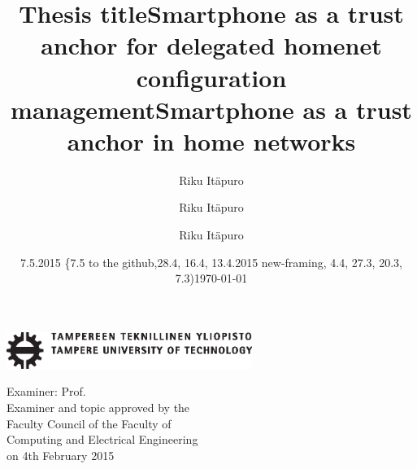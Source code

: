 \documentclass[12pt,a4paper,english]{tutthesis}
\author{Riku Itäpuro}
\title{Thesis title}      %
\author{Riku Itäpuro}
\title{Smartphone as a trust anchor for delegated homenet configuration management}
\author{Riku Itäpuro}
\date{7.5.2015 \{7.5 to the github,28.4, 16.4, 13.4.2015 new-framing, 4.4, 27.3,  20.3, 7.3)}
\title{Smartphone as a trust anchor in home networks}
\begin{document}
\maketitle



\newpage             %

 \pagestyle{headings}
 \thispagestyle{empty}
\date\today
 \vspace*{-.5cm}\noindent
 \includegraphics[width=8cm]{tty_tut_logo}   %

\vspace{6.8cm}
\maketitle
\vspace{6.7cm} %

\begin{flushright}  
  \begin{minipage}[c]{6.8cm}
    \begin{spacing}{1.0}
      \textsf{Examiner: Prof. \@examiner}\\
      \textsf{Examiner and topic approved by the}\\ 
      \textsf{Faculty Council of the Faculty of} \\
      \textsf{Computing and Electrical Engineering} \\
      \textsf{on 4th February 2015}\\
    \end{spacing}
  \end{minipage}
\end{flushright}
\end{document}

